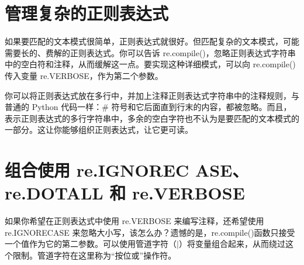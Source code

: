 \section{管理复杂的正则表达式}
如果要匹配的文本模式很简单，正则表达式就很好。但匹配复杂的文本模式，可能需要长的、费解的正则表达式。你可以告诉 re.compile()，忽略正则表达式字符串中的空白符和注释，从而缓解这一点。要实现这种详细模式，可以向 re.compile()传入变量 re.VERBOSE，作为第二个参数。

你可以将正则表达式放在多行中，并加上注释正则表达式字符串中的注释规则，与普通的 Python 代码一样：\# 符号和它后面直到行末的内容，都被忽略。而且，表示正则表达式的多行字符串中，多余的空白字符也不认为是要匹配的文本模式的一部分。这让你能够组织正则表达式，让它更可读。

\section{组合使用 re.IGNOREC ASE、re.DOTALL 和 re.VERBOSE}
如果你希望在正则表达式中使用 re.VERBOSE 来编写注释，还希望使用 re.IGNORECASE 来忽略大小写，该怎么办？遗憾的是，re.compile()函数只接受一个值作为它的第二参数。可以使用管道字符（$|$）将变量组合起来，从而绕过这个限制。管道字符在这里称为“按位或”操作符。